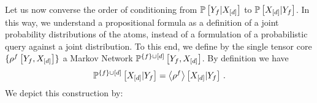 %	



%		
%


Let us now converse the order of conditioning from $\mathbb{P}\left[Y_{f}|X_{[d]}\right]$ to $\mathbb{P}\left[X_{[d]}|Y_{f}\right]$.
In this way, we understand a propositional formula as a definition of a joint probability distributions of the atoms, instead of a formulation of a probabilistic query against a joint distribution.
To this end, we define by the single tensor core $\{\rho^{f}\left[Y_{f},X_{[d]}\right]\}$ a Markov Network $\mathbb{P}^{\{f\}\cup[d]}\left[Y_{f},X_{[d]}\right]$.
By definition we have
\begin{align*}
	\mathbb{P}^{\{f\}\cup[d]}\left[X_{[d]}|Y_{f}\right]
	= \left\langle \rho^{f}\right\rangle \left[ X_{[d]} | Y_{f} \right] \, .
\end{align*}
We depict this construction by:
\begin{center}
	
\end{center}

